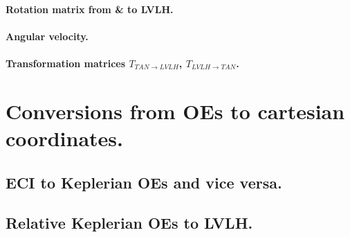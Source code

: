 			\paragraph{Rotation matrix from \& to LVLH. \\}
			\paragraph{Angular velocity. \\}
			\paragraph{Transformation matrices $T_{TAN\rightarrow LVLH}$, $T_{LVLH\rightarrow TAN}$. \\}
		
\section{Conversions from OEs to cartesian coordinates.}
%
%
	\subsection{ECI to Keplerian OEs and vice versa.}
	\subsection{Relative Keplerian OEs to LVLH.}
